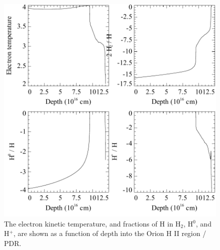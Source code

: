 \begin{figure}
\begin{center}
\includegraphics[clip=on,width=0.8\columnwidth,height=0.8\textheight,keepaspectratio]{orion_hii_pdr_pp}
\end{center}
\caption{The electron kinetic temperature, and fractions of H in H$_2$,
H$^0$, and H$^+$, are shown as a function of depth into the 
Orion H II region / PDR.}
\label{fig:orion_hii_pdr_pp}
\end{figure}

%
